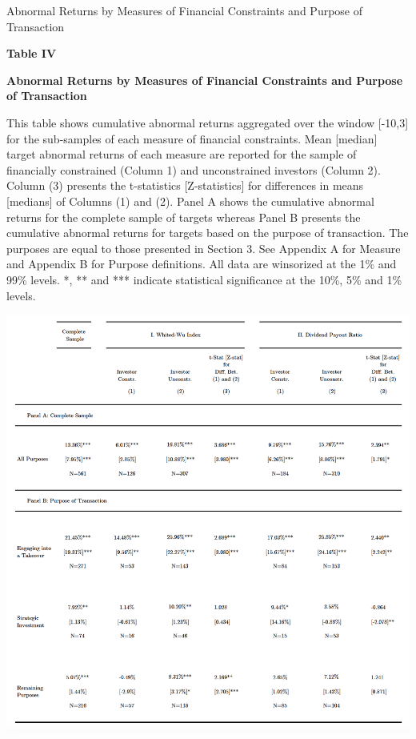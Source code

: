 \documentclass[12pt]{article}
\begin{document}
\begin{table}[!htbp]
	\centering
	\captionsetup{textformat=empty,labelformat=blank}
	\caption{Abnormal Returns by Measures of Financial Constraints and Purpose of Transaction}
	\textbf{Table IV}\par\medskip
	\large\textbf{Abnormal Returns by Measures of Financial Constraints and Purpose of Transaction}\par\medskip
	\justifying
	\footnotesize\noindent{}This table shows cumulative abnormal returns aggregated over the window [-10,3] for the sub-samples of each measure of financial constraints. Mean [median] target abnormal returns of each measure are reported for the sample of financially constrained (Column 1) and unconstrained investors (Column 2). Column (3) presents the t-statistics [Z-statistics] for differences in means [medians] of Columns (1) and (2). Panel A shows the cumulative abnormal returns for the complete sample of targets whereas Panel B presents the cumulative abnormal returns for targets based on the purpose of transaction. The purposes are equal to those presented in Section 3. See Appendix A for Measure and Appendix B for Purpose definitions. All data are winsorized at the 1\% and 99\% levels. *, ** and *** indicate statistical significance at the 10\%, 5\% and 1\% levels.  \par\medskip
	\centering													
	\begin{adjustbox}{width=\textwidth}
		\includegraphics{ar_measure1_final}
	\end{adjustbox}\par\medskip
\end{table}
\end{document}
